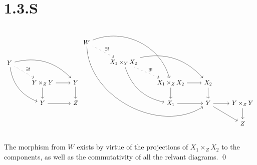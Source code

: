 \documentclass{article}
\begin{document}
\section{1.3.S}
\[
    \begin{tikzcd}
        Y \ar[rdd, bend right] \ar[rrd, bend left] \ar[rd, "\exists!", dotted] &                            &          \\
                                                                               & Y \times_Z Y \ar[d] \ar[r] & Y \ar[d] \\
                                                                               & Y \ar[r]                   & Z
    \end{tikzcd}
    \begin{tikzcd}
        W \arrow[rrrddd, bend right=60] \arrow[rrdd, bend left=49] \arrow[rd, "\exists!", dotted] &                                                                                                &                                      &                        &                       \\
                                                                                                  & X_1 \times_Y X_2 \arrow[rdd, bend right] \arrow[rrd, bend left] \arrow[rd, "\exists!", dotted] &                                      &                        &                       \\
                                                                                                  &                                                                                                & X_1 \times_Z X_2 \arrow[r] \arrow[d] & X_2 \arrow[d]          &                       \\
                                                                                                  &                                                                                                & X_1 \arrow[r]                        & Y \arrow[rd] \arrow[r] & Y\times_Z Y \arrow[d] \\
                                                                                                  &                                                                                                &                                      &                        & Z
    \end{tikzcd}
\]

The morphism from $W$ exists by virtue of the projections of $X_1 \times_Z X_2$ to the components, as well as the commutativity of all the relvant diagrams. \qed
\end{document}

